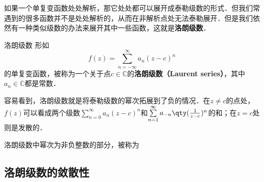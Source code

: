 

如果一个单复变函数处处解析，那它处处都可以展开成泰勒级数的形式．但我们常遇到的很多函数并不是处处解析的，从而在非解析点处无法泰勒展开．但是我们依然有一种类似级数的办法来展开其中一些函数，这就是\textbf{洛朗级数}．

\begin{definition}{洛朗级数}
形如
\begin{equation}
f(z)=\sum\limits_{n=-\infty}^{\infty} a_n(z-c)^n
\end{equation}
的单复变函数，被称为一个关于点$c\in\mathbb{C}$的\textbf{洛朗级数（Laurent series）}，其中$a_n\in\mathbb{C}$都是常数．


\end{definition}

容易看到，洛朗级数就是将泰勒级数的幂次拓展到了负的情况．在$z\neq c$的点处，$f(z)$可以看成两个级数$\sum\limits_{n=0}^{\infty} a_n(z-c)^n$和$\sum\limits_{n=1}^{\infty} a_{-n}\qty(\frac{1}{z-c})^n$的和；在$z=c$处则是发散的．

洛朗级数中幂次为非负整数的部分，被称为

\subsection{洛朗级数的敛散性}


















